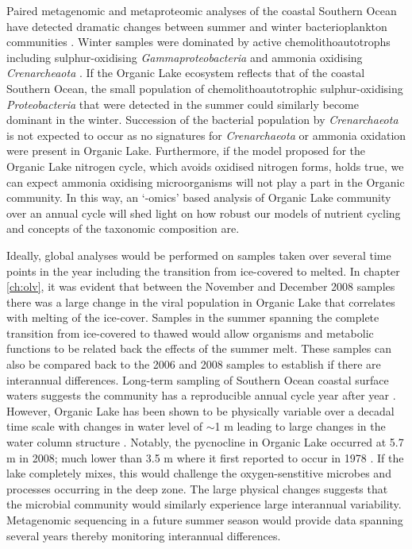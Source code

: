 Paired metagenomic and metaproteomic analyses of the coastal Southern Ocean have detected dramatic changes between summer and winter bacterioplankton communities \cite{Grzymski2012, Williams2012a}.
Winter samples were dominated by active chemolithoautotrophs including sulphur-oxidising \emph{Gammaproteobacteria} and ammonia oxidising \emph{Crenarcheaota} \cite{Grzymski2012, Williams2012b}.
If the Organic Lake ecosystem reflects that of the coastal Southern Ocean, the small population of chemolithoautotrophic sulphur-oxidising \emph{Proteobacteria} that were detected in the summer could similarly become dominant in the winter.
Succession of the bacterial population by \emph{Crenarchaeota} is not expected to occur as no signatures for \emph{Crenarchaeota} or ammonia oxidation were present in Organic Lake.
Furthermore, if the model proposed for the Organic Lake nitrogen cycle, which avoids oxidised nitrogen forms, holds true, we can expect ammonia oxidising microorganisms will not play a part in the Organic community.
In this way, an `-omics' based analysis of Organic Lake community over an annual cycle will shed light on how robust our models of nutrient cycling and concepts of the taxonomic composition are.

Ideally, global analyses would be performed on samples taken over several time points in the year including the transition from ice-covered to melted.
In chapter \ref{ch:olv}, it was evident that between the November and December 2008 samples there was a large change in the viral population in Organic Lake that correlates with melting of the ice-cover.
Samples in the summer spanning the complete transition from ice-covered to thawed would allow organisms and metabolic functions to be related back the effects of the summer melt.
These samples can also be compared back to the 2006 and 2008 samples to establish if there are interannual differences.
Long-term sampling of Southern Ocean coastal surface waters suggests the community has a reproducible annual cycle year after year \cite{Murray2007}.
However, Organic Lake has been shown to be physically variable over a decadal time scale with changes in water level of $\sim$1 m leading to large changes in the water column structure \cite{Gibson1995, Gibson1996}.
Notably, the pycnocline in Organic Lake occurred at 5.7 m in 2008; much lower than 3.5 m where it first reported to occur in 1978 \cite{Franzmann1987b}.
If the lake completely mixes, this would challenge the oxygen-senstitive microbes and processes occurring in the deep zone.
The large physical changes suggests that the microbial community would similarly experience large interannual variability.
Metagenomic sequencing in a future summer season would provide data spanning several years thereby monitoring interannual differences.

